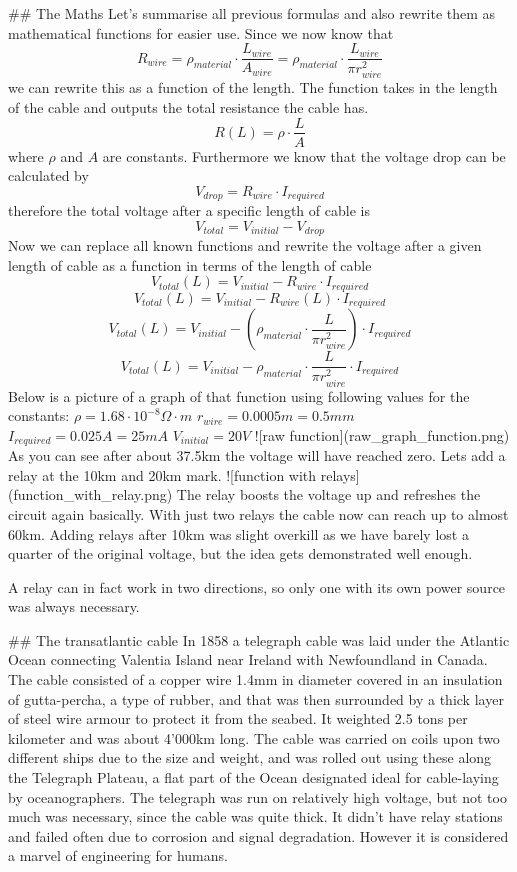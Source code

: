 ## The Maths
Let's summarise all previous formulas and also rewrite them as mathematical functions for easier use.
Since we now know that
\[
R_{wire}=\rho_{material}\cdot \frac{L_{wire}}{A_{wire}} =\rho_{material}\cdot \frac{L_{wire}}{\pi r_{wire}^2}
\]
we can rewrite this as a function of the length. The function takes in the length of the cable and outputs the total resistance the cable has.
\[
R(L)=\rho \cdot \frac{L}{A}
\]
where $\rho$ and $A$ are constants.
Furthermore we know that the voltage drop can be calculated by 
\[
V_{drop} = R_{wire} \cdot I_{required}    
\]
therefore the total voltage after a specific length of cable is
\[
V_{total} = V_{initial} - V_{drop}
\]
Now we can replace all known functions and rewrite the voltage after a given length of cable as a function in terms of the length of cable
\[
V_{total}(L)=V_{initial} - R_{wire} \cdot I_{required}
\]
\[
V_{total}(L)=V_{initial} - R_{wire}(L) \cdot I_{required}    
\]
\[
V_{total}(L)=V_{initial} - (\rho_{material}\cdot \frac{L}{\pi r_{wire}^2}) \cdot I_{required}
\]
\[
V_{total}(L)=V_{initial}-\rho_{material}\cdot \frac{L}{\pi r_{wire}^2}\cdot I_{required}
\]
Below is a picture of a graph of that function using following values for the constants:
$\rho = 1.68\cdot 10^{-8} \Omega\cdot m $
$r_{wire}=0.0005m=0.5mm$
$I_{required}=0.025A=25mA$
$V_{initial}=20V$
![raw function](raw_graph_function.png)
As you can see after about 37.5km the voltage will have reached zero. Lets add a relay at the 10km and 20km mark.
![function with relays](function_with_relay.png)
The relay boosts the voltage up and refreshes the circuit again basically. With just two relays the cable now can reach up to almost 60km. Adding relays after 10km was slight overkill as we have barely lost a quarter of the original voltage, but the idea gets demonstrated well enough.

A relay can in fact work in two directions, so only one with its own power source was always necessary.


## The transatlantic cable
In 1858 a telegraph cable was laid under the Atlantic Ocean connecting Valentia Island near Ireland with Newfoundland in Canada. The cable consisted of a copper wire 1.4mm in diameter covered in an insulation of gutta-percha, a type of rubber, and that was then surrounded by a thick layer of steel wire armour to protect it from the seabed. It weighted 2.5 tons per kilometer and was about 4'000km long. The cable was carried on coils upon two different ships due to the size and weight, and was rolled out using these along the Telegraph Plateau, a flat part of the Ocean designated ideal for cable-laying by oceanographers. The telegraph was run on relatively high voltage, but not too much was necessary, since the cable was quite thick. It didn't have relay stations and failed often due to corrosion and signal degradation. However it is considered a marvel of engineering for humans. 